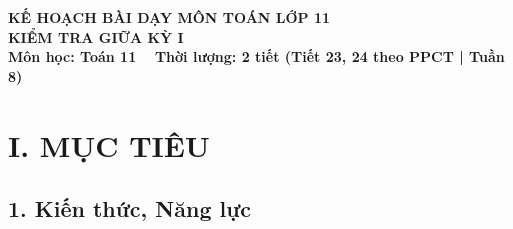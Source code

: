 \documentclass[12pt, a4paper]{article}
\begin{document}
\begin{center}
    {\fontsize{14pt}{17pt}\selectfont \textbf{KẾ HOẠCH BÀI DẠY MÔN TOÁN LỚP 11}}\\[6pt]
    {\fontsize{16pt}{19pt}\selectfont \textbf{KIỂM TRA GIỮA KỲ I}}\\[4pt]
    {\fontsize{12pt}{15pt}\selectfont \textbf{Môn học: Toán 11} \ \textbar \ \textbf{Thời lượng: 2 tiết (Tiết 23, 24 theo PPCT | Tuần 8)}}
\end{center}

\vspace{5pt}

\section*{I. MỤC TIÊU}

\subsection*{1. Kiến thức, Năng lực}
\end{document}
